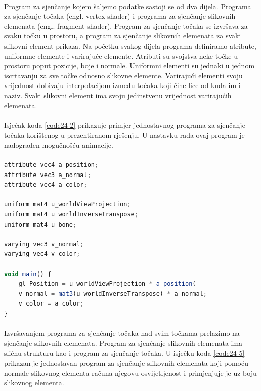 \documentclass[times, utf8, diplomski]{fer}
\begin{document}
\paragraph{}
Program za sjenčanje kojem šaljemo podatke sastoji se od dva dijela. Programa za sjenčanje točaka (engl. vertex shader) i programa za sjenčanje slikovnih elemenata (engl. fragment shader). Program za sjenčanje točaka se izvršava za svaku točku u prostoru, a program za sjenčanje slikovnih elemenata za svaki slikovni element prikaza. Na početku svakog dijela programa definiramo atribute, uniformne elemente i varirajuće elemente. Atributi su svojstva neke točke u prostoru poput pozicije, boje i normale. Uniformni elementi su jednaki u jednom iscrtavanju za sve točke odnosno slikovne elemente. Varirajući elementi svoju vrijednost dobivaju interpolacijom između točaka koji čine lice od kuda im i naziv. Svaki slikovni element ima svoju jedinstvenu vrijednost varirajućih elemenata.

\paragraph{}
Isječak koda \ref{code24-2} prikazuje primjer jednostavnog programa za sjenčanje točaka korištenog u prezentiranom rješenju. U nastavku rada ovaj program je nadograđen mogučnošću animacije.

\paragraph{}
\begin{lstlisting}[language=Javascript,caption=Program za sjenčanje točaka,label=code24-4]
attribute vec4 a_position;
attribute vec3 a_normal;
attribute vec4 a_color;

uniform mat4 u_worldViewProjection;
uniform mat4 u_worldInverseTranspose;
uniform mat4 u_bone;

varying vec3 v_normal;
varying vec4 v_color;

void main() {
    gl_Position = u_worldViewProjection * a_position(
    v_normal = mat3(u_worldInverseTranspose) * a_normal;
    v_color = a_color;
}
\end{lstlisting}

\paragraph{}
Izvršavanjem programa za sjenčanje točaka nad svim točkama prelazimo na sjenčanje slikovnih elemenata. Program za sjenčanje slikovnih elemenata ima sličnu strukturu kao i program za sjenčanje točaka. U isječku koda \ref{code24-5} prikazan je jednostavan program za sjenčanje slikovnih elemenata koji pomoću normale slikovnog elementa računa njegovu osvijetljenost i primjenjuje je uz boju slikovnog elementa.
\end{document}
